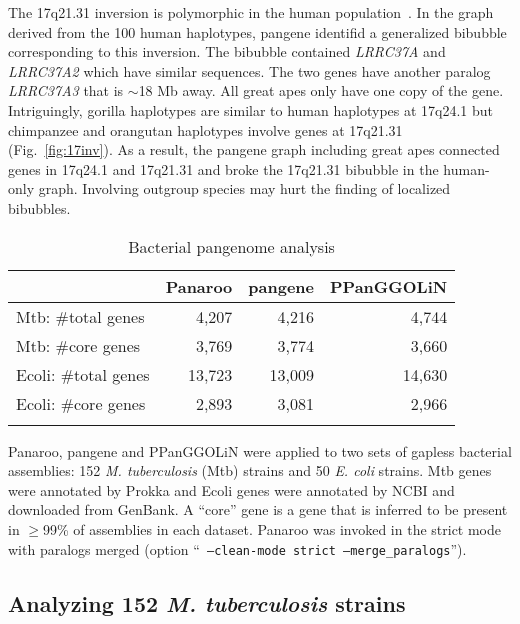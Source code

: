 \documentclass[webpdf,contemporary,large,namedate]{oup-authoring-template}%
\begin{document}
The 17q21.31 inversion is polymorphic in the human population~\citep{Boettger:2012aa,Steinberg:2012aa}.
In the graph derived from the 100 human haplotypes, pangene identifid a generalized bibubble corresponding to this inversion.
The bibubble contained \emph{LRRC37A} and \emph{LRRC37A2} which have similar sequences.
The two genes have another paralog \emph{LRRC37A3} that is $\sim$18 Mb away.
All great apes only have one copy of the gene.
Intriguingly, gorilla haplotypes are similar to human haplotypes at 17q24.1
but chimpanzee and orangutan haplotypes involve genes at 17q21.31 (Fig.~\ref{fig:17inv}).
As a result, the pangene graph including great apes connected genes in 17q24.1 and 17q21.31
and broke the 17q21.31 bibubble in the human-only graph.
Involving outgroup species may hurt the finding of localized bibubbles.

\begin{table}[!tb]
\caption{Bacterial pangenome analysis\label{tab:bac}}
\begin{tabular*}{\columnwidth}{@{\extracolsep\fill}lrrr@{\extracolsep\fill}}
\toprule
& Panaroo & pangene & PPanGGOLiN\\
\midrule
Mtb: \#total genes   & 4,207  & 4,216  & 4,744  \\
Mtb: \#core genes    & 3,769  & 3,774  & 3,660  \\
Ecoli: \#total genes & 13,723 & 13,009 & 14,630 \\
Ecoli: \#core genes  & 2,893  & 3,081  & 2,966  \\
\botrule
\end{tabular*}
\begin{tablenotes}
\item Panaroo, pangene and PPanGGOLiN were applied to two sets of gapless bacterial assemblies:
152 \emph{M. tuberculosis} (Mtb) strains and 50 \emph{E. coli} strains.
Mtb genes were annotated by Prokka and Ecoli genes were annotated by NCBI and downloaded from GenBank.
A ``core'' gene is a gene that is inferred to be present in $\ge$99\% of assemblies in each dataset.
Panaroo was invoked in the strict mode with paralogs merged (option ``{\tt
--clean-mode strict --merge\_paralogs}'').
\end{tablenotes}
\end{table}

\subsection{Analyzing 152 \textit{M. tuberculosis} strains}
\end{document}
